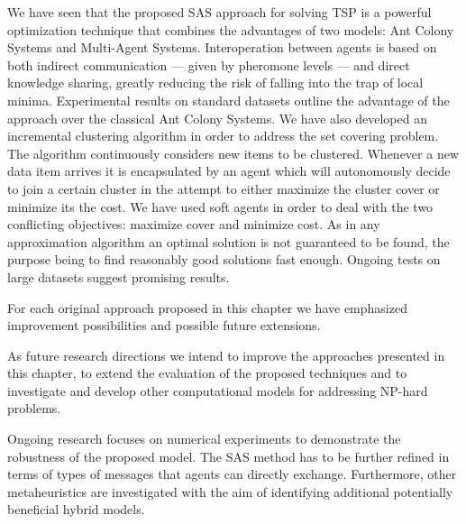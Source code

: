 We have seen that the proposed SAS approach for solving TSP is a powerful optimization technique that combines the advantages of two models: Ant Colony Systems and Multi-Agent Systems. Interoperation between agents is based on both indirect communication --- given by pheromone levels --- and direct knowledge sharing, greatly reducing the risk of
falling into the trap of local minima. Experimental results on standard datasets outline the advantage of the approach over the classical Ant Colony Systems.
We have also developed an incremental clustering algorithm in order to address the set covering problem. The algorithm continuously considers new items to be clustered. Whenever a new data item arrives it is encapsulated by an agent which will autonomously decide to join a certain cluster in the attempt to either maximize the cluster cover or minimize its the cost. We have used soft agents in order to deal with the two conflicting objectives: maximize cover and minimize cost. As in any approximation algorithm an optimal solution is not guaranteed to be found, the purpose being to find reasonably good solutions fast enough. Ongoing tests on large datasets \cite{website:scp} suggest promising results.

For each original approach proposed in this chapter we have emphasized improvement possibilities and possible future extensions.

As future research directions we intend to improve the approaches presented in this chapter, to extend the evaluation of the proposed techniques and to investigate  and develop other computational models for addressing NP-hard problems.


Ongoing research focuses on numerical experiments to demonstrate the robustness of the proposed model. The SAS method has to be further refined in terms of types of messages that agents can directly exchange. Furthermore, other metaheuristics are investigated with the aim of identifying additional potentially beneficial
hybrid models.
